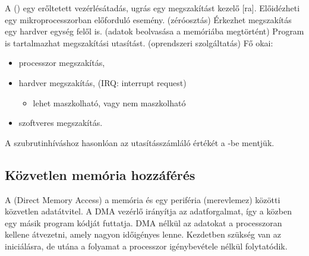 \documentclass[../main.tex]{subfiles}
\begin{document}
A  () egy erőltetett vezérlésátadás,
ugrás egy megszakítást kezelő [ra]. Előidézheti egy
mikroprocesszorban előforduló esemény. (zéróosztás)
Érkezhet megszakítás egy hardver egység felől is. (adatok beolvasása a
memóriába megtörtént) Program is tartalmazhat megszakítási utasítást.
(oprendszeri szolgáltatás) Fő okai:
\begin{itemize}
  \item processzor megszakítás,
  \item hardver megszakítás, (IRQ: interrupt request)
        \begin{itemize}
          \item lehet maszkolható, vagy nem maszkolható
        \end{itemize}
  \item szoftveres megszakítás.
\end{itemize}
A szubrutinhíváshoz hasonlóan az utasításszámláló értékét a -be
mentjük.

\subsection{Közvetlen memória hozzáférés}

A  (Direct Memory Access) a memória és egy periféria (merevlemez)
közötti közvetlen adatátvitel. A DMA vezérlő irányítja az adatforgalmat,
így a  közben egy másik program kódját futtatja. DMA nélkül az
adatokat a processzoran kellene átvezetni, amely nagyon időigényes lenne.
Kezdetben szükség van az iniciálásra, de utána a folyamat a processzor
igénybevétele nélkül folytatódik.
\end{document}
